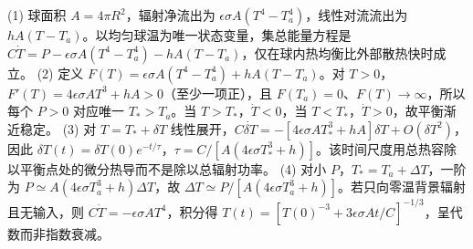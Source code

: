 (1) 球面积 \(A=4\pi R^2\)，辐射净流出为 \(\epsilon\sigma A(T^4-T_a^4)\)，线性对流流出为 \(hA(T-T_a)\)。以均匀球温为唯一状态变量，集总能量方程是 \(C\dot T=P-\epsilon\sigma A(T^4-T_a^4)-hA(T-T_a)\)，仅在球内热均衡比外部散热快时成立。
(2) 定义 \(F(T)=\epsilon\sigma A(T^4-T_a^4)+hA(T-T_a)\)。对 \(T>0\)，\(F'(T)=4\epsilon\sigma AT^3+hA>0\)（至少一项正），且 \(F(T_a)=0\)、\(F(T)\to\infty\)，所以每个 \(P>0\) 对应唯一 \(T_*>T_a\)。当 \(T>T_*\)，\(\dot T<0\)，当 \(T<T_*\)，\(\dot T>0\)，故平衡渐近稳定。
(3) 对 \(T=T_*+\delta T\) 线性展开，\(C\dot{\delta T}=-[4\epsilon\sigma AT_*^3+hA]\delta T+O(\delta T^2)\)，因此 \(\delta T(t)=\delta T(0)e^{-t/\tau}\)，\(\tau=C/[A(4\epsilon\sigma T_*^3+h)]\)。该时间尺度用总热容除以平衡点处的微分热导而不是除以总辐射功率。
(4) 对小 \(P\)，\(T_*=T_a+\Delta T\)，一阶为 \(P\simeq A(4\epsilon\sigma T_a^3+h)\Delta T\)，故 \(\Delta T\simeq P/[A(4\epsilon\sigma T_a^3+h)]\)。若只向零温背景辐射且无输入，则 \(C\dot T=-\epsilon\sigma AT^4\)，积分得 \(T(t)=[T(0)^{-3}+3\epsilon\sigma At/C]^{-1/3}\)，呈代数而非指数衰减。
